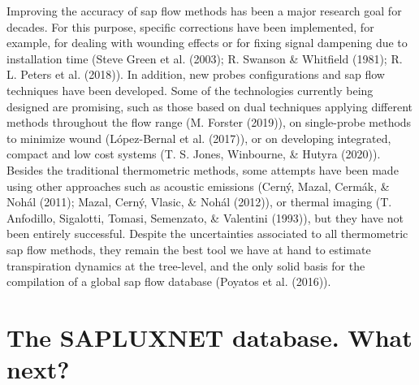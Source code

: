 \documentclass[11pt,twoside]{reedthesis}
\begin{document}
Improving the accuracy of sap flow methods has been a major research
goal for decades. For this purpose, specific corrections have been
implemented, for example, for dealing with wounding effects or for
fixing signal dampening due to installation time (Steve Green et al.
(2003); R. Swanson \& Whitfield (1981); R. L. Peters et al. (2018)). In
addition, new probes configurations and sap flow techniques have been
developed. Some of the technologies currently being designed are
promising, such as those based on dual techniques applying different
methods throughout the flow range (M. Forster (2019)), on single-probe
methods to minimize wound (López-Bernal et al. (2017)), or on developing
integrated, compact and low cost systems (T. S. Jones, Winbourne, \&
Hutyra (2020)). Besides the traditional thermometric methods, some
attempts have been made using other approaches such as acoustic
emissions (Cerný, Mazal, Cermák, \& Nohál (2011); Mazal, Cerný, Vlasic,
\& Nohál (2012)), or thermal imaging (T. Anfodillo, Sigalotti, Tomasi,
Semenzato, \& Valentini (1993)), but they have not been entirely
successful. Despite the uncertainties associated to all thermometric sap
flow methods, they remain the best tool we have at hand to estimate
transpiration dynamics at the tree-level, and the only solid basis for
the compilation of a global sap flow database (Poyatos et al.
(2016)).\par

\section{The SAPLUXNET database. What
next?}\label{the-sapluxnet-database.-what-next}
\end{document}
